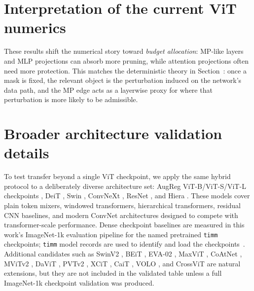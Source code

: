 \documentclass[11pt]{article}
\makeatletter
\theoremstyle{plain}
\theoremstyle{definition}
\theoremstyle{remark}
\newcommand{\1}{\mathbf{1}}
\newcommand{\mainref}[1]{\@ifundefined{r@main-#1}{\@ifundefined{r@#1}{\ref*{orone-#1}}{\ref{#1}}}{\ref*{main-#1}}}
\makeatother
\begin{document}


\section{Interpretation of the current ViT numerics}
\label{sec:s33-interpretation}

\label{subsec:current_numerics_interpretation_meth}

These results shift the numerical story toward \emph{budget allocation}: MP-like layers and MLP projections can absorb more pruning, while attention projections often need more protection. This matches the deterministic theory in Section~\mainref{Main_theory_gen}: once a mask is fixed, the relevant object is the perturbation induced on the network's data path, and the MP edge acts as a layerwise proxy for where that perturbation is more likely to be admissible.



\section{Broader architecture validation details}
\label{sec:s34-arch-validation}

\label{subsec:architecture_validation_meth}

To test transfer beyond a single ViT checkpoint, we apply the same hybrid protocol to a deliberately diverse architecture set: AugReg ViT-B/ViT-S/ViT-L checkpoints \cite{dosovitskiy2021image,steiner2022how}, DeiT \cite{touvron2021training}, Swin \cite{liu2021swin}, ConvNeXt \cite{liu2022convnet}, ResNet \cite{he2016deep}, and Hiera \cite{ryali2023hiera}.  These models cover plain token mixers, windowed transformers, hierarchical transformers, residual CNN baselines, and modern ConvNet architectures designed to compete with transformer-scale performance.  Dense checkpoint baselines are measured in this work's ImageNet-1k evaluation pipeline for the named pretrained \texttt{timm} checkpoints; \texttt{timm} model records are used to identify and load the checkpoints~\cite{rw2019timm}.  Additional candidates such as SwinV2 \cite{liu2022swinv2}, BEiT \cite{bao2022beit}, EVA-02 \cite{fang2023eva02}, MaxViT \cite{tu2022maxvit}, CoAtNet \cite{dai2021coatnet}, MViTv2 \cite{li2022mvitv2}, DaViT \cite{ding2022davit}, PVTv2 \cite{wang2022pvtv2}, XCiT \cite{elnouby2021xcit}, CaiT \cite{touvron2021going}, VOLO \cite{yuan2021volo}, and CrossViT \cite{chen2021crossvit} are natural extensions, but they are not included in the validated table unless a full ImageNet-1k checkpoint validation was produced.
\end{document}
